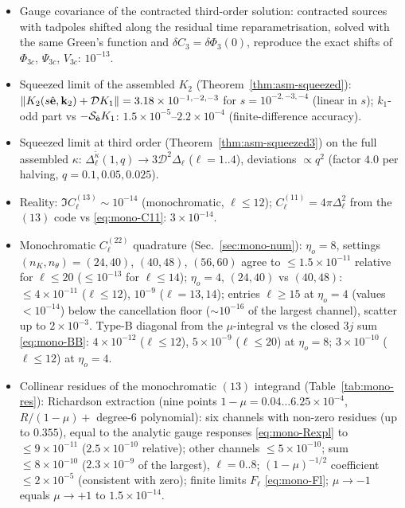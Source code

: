 \begin{itemize}
\item[EF-22] Gauge covariance of the contracted third-order solution: contracted sources with tadpoles shifted along the residual time reparametrisation,
solved with the same Green's function and $\delta C_3=\delta\Phi_3(0)$, reproduce the exact shifts of $\Phi_{3c}$, $\Psi_{3c}$, $V_{3c}$: $10^{-13}$.
\item[SQ-2] Squeezed limit of the assembled $K_2$ (Theorem~\ref{thm:asm-squeezed}): $\|K_2(s\hat{\mathbf e},\mathbf k_2)+\mathcal DK_1\|=3.18\times10^{-1,-2,-3}$ for
$s=10^{-2,-3,-4}$ (linear in $s$); $k_1$-odd part vs $-\mathcal S_{\hat{\mathbf e}}K_1$: $1.5\times10^{-5}$--$2.2\times10^{-4}$ (finite-difference accuracy).
\item[SQ-3] Squeezed limit at third order (Theorem~\ref{thm:asm-squeezed3}) on the full assembled $\kappa$: $\Delta^{\tilde\kappa}_\ell(1,q)\to3\mathcal D^2\Delta_\ell$
($\ell=1..4$), deviations $\propto q^2$ (factor $4.0$ per halving, $q=0.1,0.05,0.025$).
\item[H-13] Reality: $\Im C^{(13)}_\ell\sim10^{-14}$ (monochromatic, $\ell\le12$); $C^{(11)}_\ell=4\pi\Delta_\ell^2$ from the $(13)$ code vs \eqref{eq:mono-C11}: $3\times10^{-14}$.
\item[L-0] Monochromatic $C^{(22)}_\ell$ quadrature (Sec.~\ref{sec:mono-num}): $\eta_o=8$, settings $(n_K,n_\theta)=(24,40)$, $(40,48)$, $(56,60)$ agree to
$\le1.5\times10^{-11}$ relative for $\ell\le20$ ($\le10^{-13}$ for $\ell\le14$); $\eta_o=4$, $(24,40)$ vs $(40,48)$: $\le4\times10^{-11}$ ($\ell\le12$), $10^{-9}$
($\ell=13,14$); entries $\ell\ge15$ at $\eta_o=4$ (values $<10^{-14}$) below the cancellation floor ($\sim10^{-16}$ of the largest channel), scatter up to
$2\times10^{-3}$.  Type-B diagonal from the $\mu$-integral vs the closed $3j$ sum \eqref{eq:mono-BB}: $4\times10^{-12}$ ($\ell\le12$), $5\times10^{-9}$ ($\ell\le20$)
at $\eta_o=8$; $3\times10^{-10}$ ($\ell\le12$) at $\eta_o=4$.
\item[L-1] Collinear residues of the monochromatic $(13)$ integrand (Table~\ref{tab:mono-res}): Richardson extraction (nine points $1-\mu=0.04\ldots6.25\times10^{-4}$,
$R/(1-\mu)+$ degree-6 polynomial): six channels with non-zero residues (up to $0.355$), equal to the analytic gauge responses \eqref{eq:mono-Rexpl} to
$\le9\times10^{-11}$ ($2.5\times10^{-10}$ relative); other channels $\le5\times10^{-10}$; sum $\le8\times10^{-10}$ ($2.3\times10^{-9}$ of the largest), $\ell=0..8$;
$(1-\mu)^{-1/2}$ coefficient $\le2\times10^{-5}$ (consistent with zero); finite limits $F_\ell$ \eqref{eq:mono-Fl}; $\mu\to-1$ equals $\mu\to+1$ to $1.5\times10^{-14}$.

\end{itemize}
